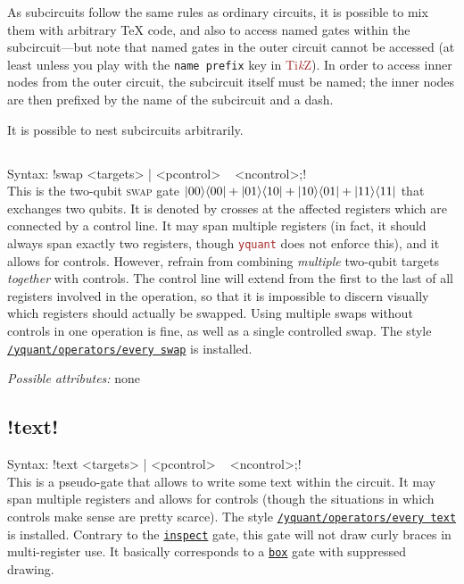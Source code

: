 \documentclass{scrartcl}
\def\TikZ{\textcolor{brown}{Ti\textit kZ}}
\def\pkg#1{\textcolor{brown}{\texttt{#1}}}
\def\gate#1{\hyperref[gate:#1]{\texttt{#1}}}
\def\style#1{\hyperref[style:#1]{\texttt{#1}}}
\def\Yquant{\pkg{yquant}}
\def\ketbra#1#2{\ket{#1}\!\bra{#2}}
\begin{document}
\begin{itemize}
               As subcircuits follow the same rules as ordinary circuits, it is possible to mix them with arbitrary \TeX{} code, and also to access named gates within the subcircuit---but note that named gates in the outer circuit cannot be accessed (at least unless you play with the \texttt{name prefix} key in \TikZ).
               In order to access inner nodes from the outer circuit, the subcircuit itself must be named; the inner nodes are then prefixed by the name of the subcircuit and a dash.

               It is possible to nest subcircuits arbitrarily.
         \end{itemize}

      \subsection{\texorpdfstring{}{swap}}\label{gate:swap}
         Syntax: \yquant!swap <targets> | <pcontrol> ~ <ncontrol>;! \\
         This is the two\hyp qubit \textsc{swap} gate $\ketbra{00}{00} + \ketbra{01}{10} + \ketbra{10}{01} + \ketbra{11}{11}$ that exchanges two qubits.
         It is denoted by crosses at the affected registers which are connected by a control line.
         It may span multiple registers (in fact, it should always span exactly two registers, though \Yquant{} does not enforce this), and it allows for controls.
         However, refrain from combining \emph{multiple} two\hyp qubit targets \emph{together} with controls.
         The control line will extend from the first to the last of all registers involved in the operation, so that it is impossible to discern visually which registers should actually be swapped.
         Using multiple swaps without controls in one operation is fine, as well as a single controlled swap.
         The style \style{/yquant/operators/every swap} is installed.

         \emph{Possible attributes:} none

      \subsection[\texorpdfstring{\yquant{text}}{text}]{\yquant!text!}\label{gate:text}
         Syntax: \yquant!text <targets> | <pcontrol> ~ <ncontrol>;! \\
         This is a pseudo\hyp gate that allows to write some text within the circuit.
         It may span multiple registers and allows for controls (though the situations in which controls make sense are pretty scarce).
         The style \style{/yquant/operators/every text} is installed.
         Contrary to the \gate{inspect} gate, this gate will not draw curly braces in multi\hyp register use.
         It basically corresponds to a \gate{box} gate with suppressed drawing.
\end{document}
